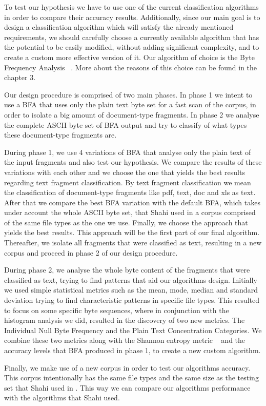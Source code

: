 To test our hypothesis we have to use one of the current classification algorithms in order to compare their accuracy results. Additionally, since our main goal is to design a classification algorithm  which will satisfy the already mentioned requirements, we should carefully choose a currently available algorithm that has the potential to be easily modified, without adding significant complexity, and to create a custom more effective version of it. Our algorithm of choice is the Byte Frequency Analysis ~\cite{MacDaniel}. More about the reasons of this choice can be found in the chapter 3.

Our design procedure is comprised of two main phases. In phase 1 we intent to use a BFA that uses only the plain text byte set for a fast scan of the corpus, in order to isolate a big amount of document-type fragments. In phase 2 we analyse the complete ASCII byte set of BFA output and try to classify of what types these document-type fragments are.


During phase 1, we use 4 variations of BFA that analyse only the plain text of the input fragments and also test our hypothesis. We compare the results of these variations with each other and we choose the one that yields the best results regarding text fragment classification. By text fragment classification we mean the classification of document-type fragments like pdf, text, doc and xls as text. After that we compare the best BFA variation  with the default BFA, which takes under account the whole ASCII byte set, that Shahi \cite{Ashim} used in a corpus comprised of the same file types as the one we use. Finally, we choose the approach that yields the best results. This approach will be the first part of our final algorithm. Thereafter, we isolate all fragments that were classified as text, resulting in a new corpus and proceed in phase 2 of our design procedure.

During phase 2, we analyse the whole byte content of the fragments that were classified as text, trying to find patterns that aid our algorithms design. Initially we used simple statistical metrics such as the mean, mode, median and standard deviation trying to find characteristic patterns in specific file types. This resulted to focus on some specific byte sequences, where in conjunction with the histogram analysis we did, resulted in the discovery of two new metrics. The Individual Null Byte Frequency and the Plain Text Concentration Categories. We combine these two metrics along with the Shannon entropy metric ~\cite{Shannon} and the accuracy levels that BFA produced in phase 1, to create a new custom algorithm.

Finally, we make use of a new corpus in order to test our algorithms accuracy. This corpus intentionally has the same file types and the same size as the testing set that Shahi used in \cite{Ashim}. This way we can compare our algorithms performance with the algorithms that Shahi used.



 


